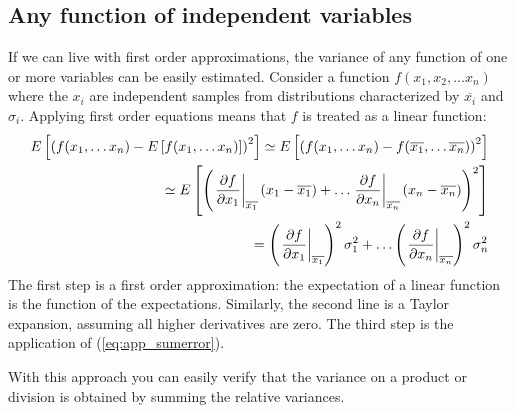 \subsection{Any function of independent variables}
If we can live with first order approximations, the variance of any function
of one or more variables can be easily estimated. Consider a function
$f(x_1, x_2, \ldots x_n)$ where the $x_i$ are independent samples from
distributions characterized by $\overline{x_i}$ and $\sigma_i$. Applying first order
equations means that $f$ is treated as a linear function:
\begin{eqnarray}
  E\left[{\left( f(x_1, \ldots x_n) - E\left[{f(x_1, \ldots x_n)}\right]\right)^2}\right]
  \simeq  E\left[{\left( f(x_1,\ldots x_n) 
        - f(\overline{x_1}, \ldots \overline{x_n})\right)^2}\right] \nonumber \\
  \simeq  E\left[{\left( \left. \frac{\partial f}{\partial x_1} \right|_{\overline{x_1}}
                 (x_1 - \overline{x_1}) + \ldots
            \left. \frac{\partial f}{\partial x_n} \right|_{\overline{x_n}}
                 (x_n - \overline{x_n}) \right)^2}\right] \nonumber \\
  = \left( \left. \frac{\partial f}{\partial x_1} \right|_{\overline{x_1}} \right)^2
        \sigma_1^2 + \ldots
    \left( \left. \frac{\partial f}{\partial x_n} \right|_{\overline{x_n}} \right)^2
         \sigma_n^2
\end{eqnarray}
The first step is a first order approximation: the expectation of a linear
function is the function of the expectations. Similarly, the second line is a
Taylor expansion, assuming all higher derivatives are zero. The third step is
the application of (\ref{eq:app_sumerror}).

With this approach you can easily verify that the variance on a product or
division is obtained by summing the relative variances.

\newpage
